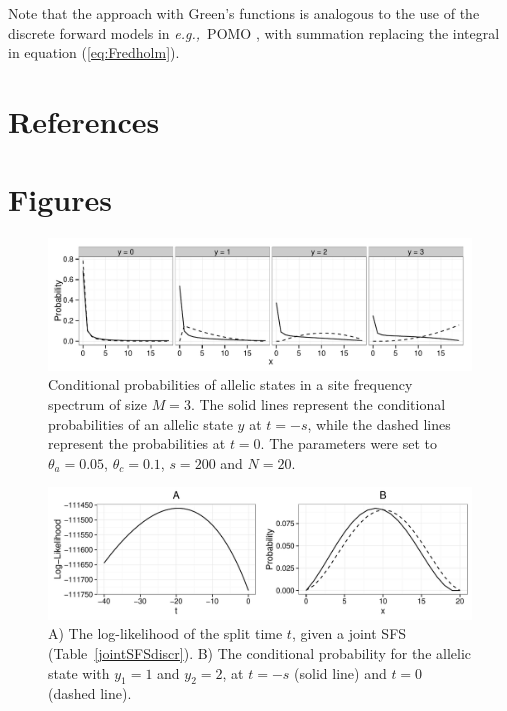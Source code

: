 \documentclass[preprint]{elsarticle}
\newcommand\eg{{\it e.g.,}}
\begin{document}
Note that the approach with Green's functions is analogous to the use of the discrete forward models in \eg\ POMO \citep{DeMa13}, with summation replacing the integral in equation (\ref{eq:Fredholm}).

\section*{References}



\newpage

\section*{Figures}

\begin{figure}[ht]
\includegraphics[width = 12cm]{cProb.pdf}
\caption{Conditional probabilities of allelic states in a site frequency spectrum of size $M=3$. The solid lines represent the conditional probabilities of an allelic state $y$ at $t=-s$, while the dashed lines represent the probabilities at $t=0$. The parameters were set to $\theta_a=0.05$, $\theta_c=0.1$, $s=200$ and $N=20$.}\label{cProb}
\end{figure}

\begin{figure}[ht]
\includegraphics[width = 12cm]{twoPop_14_7_2016.pdf}
\caption{A) The log-likelihood of the split time $t$, given a joint SFS (Table~\ref{jointSFSdiscr}). B) The conditional probability for the allelic state with $y_1=1$ and $y_2=2$, at $t=-s$ (solid line) and $t=0$ (dashed line).}\label{twoPopdiscr}
\end{figure}
\end{document}
